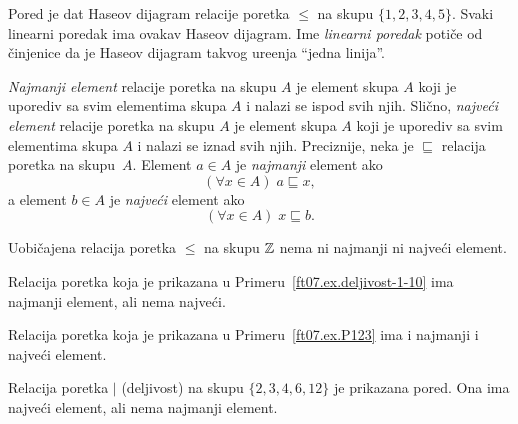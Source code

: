 \bigskip

\noindent
\begin{minipage}{3in}
  \begin{EX}
    Pored je dat Haseov dijagram relacije poretka $\le$ na skupu
    $\{1, 2, 3, 4, 5\}$. Svaki linearni poredak ima ovakav Haseov dijagram.
    Ime \emph{linearni poredak} poti\v ce od \v cinjenice da je Haseov dijagram
    takvog ure\dj enja \enquote{jedna linija}.
  \end{EX}
\end{minipage}
\hfill
\begin{minipage}{2.5in}
  \begin{center}
    
  \end{center}
\end{minipage}

\bigskip

\emph{Najmanji element} relacije poretka na skupu $A$ je element skupa $A$ koji je uporediv sa svim elementima skupa $A$
i nalazi se ispod svih njih. Sli\v cno, \emph{najve\'ci element} relacije poretka na skupu $A$ je element skupa $A$
koji je uporediv sa svim elementima skupa $A$ i nalazi se iznad svih njih. Preciznije, neka je $\sqsubseteq$ relacija
poretka na skupu~$A$. Element $a \in A$ je \emph{najmanji} element ako
$$
  (\forall x \in A) \; a \sqsubseteq x,
$$
a element $b \in A$ je \emph{najve\'ci} element ako
$$
  (\forall x \in A) \; x \sqsubseteq b.
$$

\begin{EX}\label{ft07.ex.delj-2-12}
  Uobi\v cajena relacija poretka $\le$ na skupu $\mathbb{Z}$ nema ni najmanji ni najve\'ci element.

  Relacija poretka koja je prikazana u Primeru~\ref{ft07.ex.deljivost-1-10} ima najmanji element, ali nema najve\'ci.

  Relacija poretka koja je prikazana u Primeru~\ref{ft07.ex.P123} ima i najmanji i najve\'ci element.
\end{EX}

\bigskip

\noindent
\begin{minipage}{3in}
  \hspace*{1.5em}Relacija poretka $|$ (deljivost) na skupu $\{2, 3, 4, 6, 12\}$ je prikazana pored. Ona ima najve\'ci element, ali
  nema najmanji element.
\end{minipage}
\hfill
\begin{minipage}{2.5in}
  \begin{center}
    
  \end{center}
\end{minipage}

